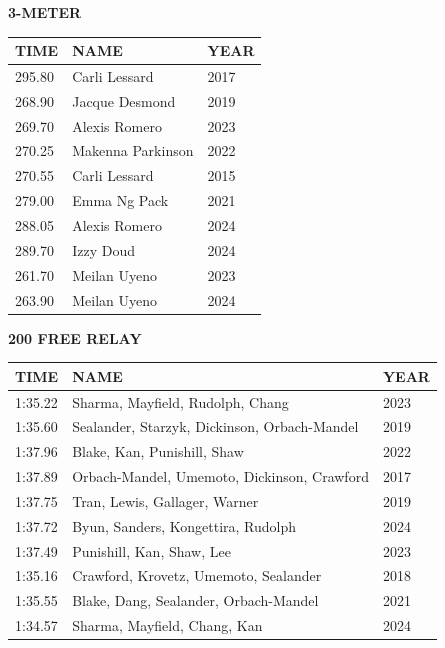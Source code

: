\begin{table}[H]
\centering
\begin{minipage}[t]{0.6\textwidth}
\centering
\textbf{3-METER}\\[0.1cm]
\begin{tabular}{@{}p{1.8cm}p{2.8cm}p{1.2cm}@{}}
\hline
    \textbf{TIME} & \textbf{NAME} & \textbf{YEAR} \\
\hline
    295.80 & Carli Lessard & 2017 \\
    268.90 & Jacque Desmond & 2019 \\
    269.70 & Alexis Romero & 2023 \\
    270.25 & Makenna Parkinson & 2022 \\
    270.55 & Carli Lessard & 2015 \\
    279.00 & Emma Ng Pack & 2021 \\
    288.05 & Alexis Romero & 2024 \\
    289.70 & Izzy Doud & 2024 \\
    261.70 & Meilan Uyeno & 2023 \\
    263.90 & Meilan Uyeno & 2024 \\
\hline
\end{tabular}
\end{minipage}
\end{table}

\begin{table}[H]
\centering
\begin{minipage}[t]{0.6\textwidth}
\centering
\textbf{200 FREE RELAY}\\[0.1cm]
\begin{tabular}{@{}p{1.8cm}p{2.8cm}p{1.2cm}@{}}
\hline
    \textbf{TIME} & \textbf{NAME} & \textbf{YEAR} \\
\hline
    1:35.22 & Sharma, Mayfield, Rudolph, Chang & 2023 \\
    1:35.60 & Sealander, Starzyk, Dickinson, Orbach-Mandel & 2019 \\
    1:37.96 & Blake, Kan, Punishill, Shaw & 2022 \\
    1:37.89 & Orbach-Mandel, Umemoto, Dickinson, Crawford & 2017 \\
    1:37.75 & Tran, Lewis, Gallager, Warner & 2019 \\
    1:37.72 & Byun, Sanders, Kongettira, Rudolph & 2024 \\
    1:37.49 & Punishill, Kan, Shaw, Lee & 2023 \\
    1:35.16 & Crawford, Krovetz, Umemoto, Sealander & 2018 \\
    1:35.55 & Blake, Dang, Sealander, Orbach-Mandel & 2021 \\
    1:34.57 & Sharma, Mayfield, Chang, Kan & 2024 \\
\hline
\end{tabular}
\end{minipage}
\end{table}

